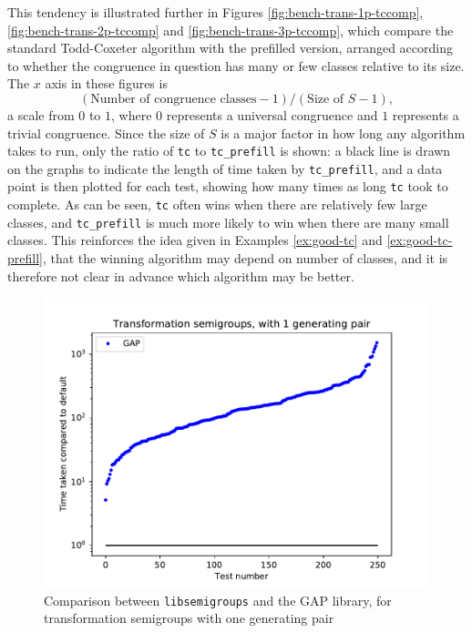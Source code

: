 This tendency is illustrated further in Figures \ref{fig:bench-trans-1p-tccomp},
\ref{fig:bench-trans-2p-tccomp} and \ref{fig:bench-trans-3p-tccomp}, which
compare the standard Todd-Coxeter algorithm with the prefilled version, arranged
according to whether the congruence in question has many or few classes relative
to its size.  The $x$ axis in these figures is
$$(\text{Number of congruence classes} - 1) / (\text{Size of~} S - 1),$$
a scale from $0$ to $1$, where $0$ represents a universal congruence and $1$
represents a trivial congruence.  Since the size of $S$ is a major factor in how
long any algorithm takes to run, only the ratio of \texttt{tc} to
\texttt{tc\_prefill} is shown: a black line is drawn on the graphs to indicate
the length of time taken by \texttt{tc\_prefill}, and a data point is then
plotted for each test, showing how many times as long \texttt{tc} took to
complete.  As can be seen, \texttt{tc} often wins when there are relatively few
large classes, and \texttt{tc\_prefill} is much more likely to win when there are
many small classes.  This reinforces the idea given in Examples \ref{ex:good-tc}
and \ref{ex:good-tc-prefill}, that the winning algorithm may depend on number of
classes, and it is therefore not clear in advance which algorithm may be better.

\begin{figure}[h]
  \centering
  \includegraphics[width=\textwidth]{pics/ch-pairs/bench-trans-1p-gap}
  \caption{Comparison between \texttt{libsemigroups} and the GAP library, for
    transformation semigroups with one generating pair}
  \label{fig:bench-trans-1p-gap}
\end{figure}

